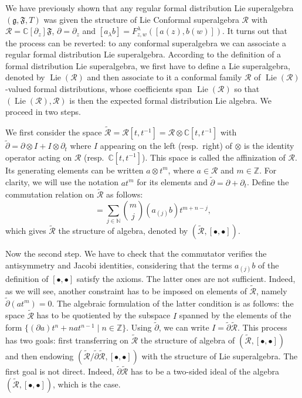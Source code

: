 \documentclass[a4paper, 12pt, reqno]{amsart}
\theoremstyle{remark}
\numberwithin{equation}{subsection}
\DeclareMathOperator{\Lie}{Lie}
\begin{document}
We have previously shown that any regular formal distribution Lie superalgebra $(\mathfrak{g}, \mathfrak{F}, T)$ was given the structure of Lie Conformal superalgebra $\mathcal{R}$ with $\mathcal{R} = \mathbb{C}[\partial_z]\mathfrak{F}$, $\partial = \partial_z$ and $[a_{\lambda}b] = F^{\lambda}_{z, w}([a(z), b(w)])$.
It turns out that the process can be reverted: to any conformal superalgebra we can associate a regular formal distribution Lie superalgebra.
According to the definition of a formal distribution Lie superalgebra, we first have to define a Lie superalgebra, denoted by $\Lie(\mathcal{R})$ and then associate to it a conformal family $\mathcal{R}$ of $\Lie(\mathcal{R})$-valued formal distributions, whose coefficients span $\Lie(\mathcal{R})$ so that $(\Lie(\mathcal{R}), \mathcal{R})$ is then the expected formal distribution Lie algebra.
We proceed in two steps.

We first consider the space $\widetilde{\mathcal{R}} = \mathcal{R}[t, t^{-1}] = \mathcal{R}\otimes\mathbb{C}[t, t^{-1}]$ with $\widetilde{\partial} = \partial \otimes I + I \otimes \partial_t$ where $I$ appearing on the left (resp.\ right) of $\otimes$ is the identity operator acting on $\mathcal{R}$ (resp.\ $\mathbb{C}[t, t^{-1}]$).
This space is called the affinization of $\mathcal{R}$.
Its generating elements can be written $a\otimes t^m$, where $a \in \mathcal{R}$ and $m \in \mathbb{Z}$.
For clarity, we will use the notation $at^m$ for its elements and $\widetilde{\partial} = \partial + \partial_t$.
Define the commutation relation on $\widetilde{\mathcal{R}}$ as follows:
\begin{equation*}
  [at^m, bt^n] = \sum_{j \in \mathbb{N}}\binom{m}{j}(a_{(j)}b)t^{m + n - j},
\end{equation*}
which gives $\widetilde{\mathcal{R}}$ the structure of algebra, denoted by $(\widetilde{\mathcal{R}},[\bullet, \bullet])$.

Now the second step. We have to check that the commutator verifies the antisymmetry and Jacobi identities, considering that the terms $a_{(j)}b$ of the definition of $[\bullet, \bullet]$ satisfy the axioms.
The latter ones are not sufficient.
Indeed, as we will see, another constraint has to be imposed on elements of $\widetilde{\mathcal{R}}$, namely $\widetilde{\partial}(at^m) = 0$.
The algebraic formulation of the latter condition is as follows: the space $\widetilde{\mathcal{R}}$ has to be quotiented by the subspace $I$ spanned by the elements of the form $\{(\partial a)t^n + nat^{n - 1} \mid n \in \mathbb{Z}\}$.
Using $\widetilde{\partial}$, we can write $I = \widetilde{\partial}\widetilde{\mathcal{R}}$.
This process has two goals: first transferring on $\widetilde{\mathcal{R}}$ the structure of algebra of $(\widetilde{\mathcal{R}}, [\bullet, \bullet])$ and then endowing $(\widetilde{\mathcal{R}}/\widetilde{\partial}\widetilde{\mathcal{R}}, [\bullet, \bullet])$ with the structure of Lie superalgebra.
The first goal is not direct.
Indeed, $\widetilde{\partial}\widetilde{\mathcal{R}}$ has to be a two-sided ideal of the algebra $(\widetilde{\mathcal{R}}, [\bullet, \bullet])$, which is the case.
\end{document}
